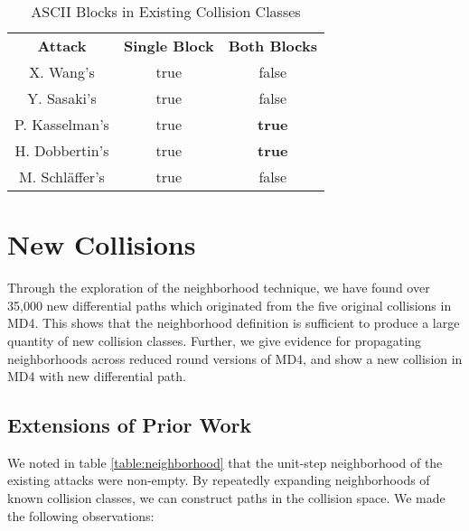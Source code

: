 \documentclass[conference]{IEEEtran}
\begin{document}
\begin{table}
    \caption{ASCII Blocks in Existing Collision Classes}
    \label{table:ascii}
    \begin{tabular}{c c c}
        \textbf{Attack} & \textbf{Single Block} & \textbf{Both Blocks} \\
        X. Wang's & true & false \\
        Y. Sasaki's & true & false \\
        P. Kasselman's & true & \textbf{true} \\
        H. Dobbertin's & true & \textbf{true} \\
        M. Schl{\"a}ffer's & true & false \\
    \end{tabular}
\end{table}


\section{New Collisions} \label{Sec:Collision}

Through the exploration of the neighborhood technique, we have found over
35,000 new differential paths which originated from the five original
collisions in MD4. This shows that the neighborhood definition is sufficient
to produce a large quantity of new collision classes. Further, we give
evidence for propagating neighborhoods across reduced round versions of MD4,
and show a new collision in MD4 with new differential path.

\subsection{Extensions of Prior Work}

We noted in table \ref{table:neighborhood} that the unit-step neighborhood of
the existing attacks were non-empty. By repeatedly expanding neighborhoods of
known collision classes, we can construct paths in the collision space. We
made the following observations:
\end{document}
